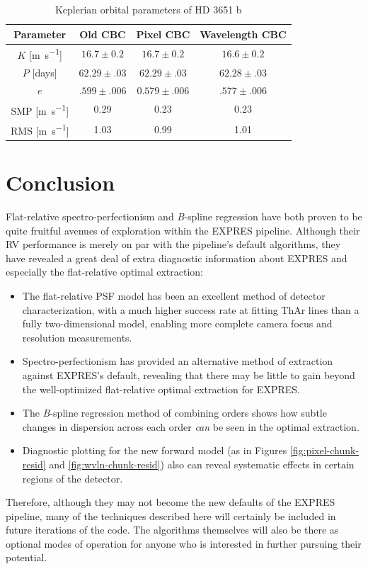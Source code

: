 \begin{table}
    \centering
    \caption[HD 3651 -- Keplerian orbital parameter comparison (chunk method)]{Keplerian orbital parameters of HD 3651 b}
    \begin{tabular}{c|ccc}
        \hline
        \hline
        Parameter & Old CBC & Pixel CBC & Wavelength CBC \\
        \hline
        $K$ [\si{\meter\per\second}] & $16.7 \pm 0.2$ & $16.7 \pm 0.2$ & $16.6 \pm 0.2$ \\
        $P$ [days] & $62.29 \pm .03$ & $62.29 \pm .03$ & $62.28 \pm .03 $\\
        $e$ & $.599 \pm .006$ & $0.579 \pm .006$ & $.577 \pm .006$ \\
        SMP [\si{\meter\per\second}] & 0.29 & 0.23 & 0.23 \\
        RMS [\si{\meter\per\second}] & 1.03 & 0.99 & 1.01 \\
    \end{tabular}
    \label{tab:cbc-rvs}
\end{table}


\section{Conclusion}
\label{pipeline2:conclusion}

Flat-relative spectro-perfectionism and \textit{B}-spline regression have both proven to be quite fruitful avenues of exploration within the EXPRES pipeline. Although their RV performance is merely on par with the pipeline's default algorithms, they have revealed a great deal of extra diagnostic information about EXPRES and especially the flat-relative optimal extraction:
\begin{itemize}
    \item The flat-relative PSF model has been an excellent method of detector characterization, with a much higher success rate at fitting ThAr lines than a fully two-dimensional model, enabling more complete camera focus and resolution measurements.
    \item Spectro-perfectionism has provided an alternative method of extraction against EXPRES's default, revealing that there may be little to gain beyond the well-optimized flat-relative optimal extraction for EXPRES.
    \item The \textit{B}-spline regression method of combining orders shows how subtle changes in dispersion across each order \textit{can} be seen in the optimal extraction.
    \item Diagnostic plotting for the new forward model (as in Figures \ref{fig:pixel-chunk-resid} and \ref{fig:wvln-chunk-resid}) also can reveal systematic effects in certain regions of the detector.
\end{itemize}
Therefore, although they may not become the new defaults of the EXPRES pipeline, many of the techniques described here will certainly be included in future iterations of the code. The algorithms themselves will also be there as optional modes of operation for anyone who is interested in further pursuing their potential.

